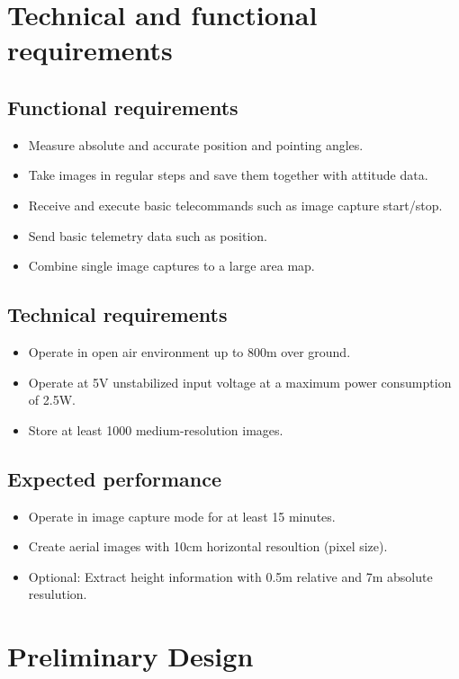 \documentclass[fontsize=11pt,paper=a4,]{scrartcl}
\begin{document}
\section{Technical and functional requirements}
\subsection{Functional requirements}
\label{sub:Functional_requirements}
\begin{itemize}
\item Measure absolute and accurate position and pointing angles.
\item Take images in regular steps and save them together with attitude data.
\item Receive and execute basic telecommands such as image capture start/stop.
\item Send basic telemetry data such as position.
\item Combine single image captures to a large area map.
\end{itemize}


\subsection{Technical requirements}
\begin{itemize}
\item Operate in open air environment up to 800m over ground.
\item Operate at 5V unstabilized input voltage at a maximum power consumption of 2.5W.
\item Store at least 1000 medium-resolution images.
\end{itemize}


\subsection{Expected performance}
\begin{itemize}
\item Operate in image capture mode for at least 15 minutes.
\item Create aerial images with 10cm horizontal resoultion (pixel size).
\item Optional: Extract height information with 0.5m relative and 7m absolute resulution.
\end{itemize}

\section{Preliminary Design}
\end{document}
